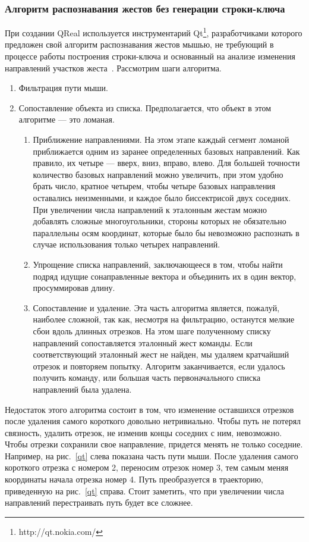 \documentclass[a5paper]{article}
\begin{document}
\subsubsection{Алгоритм распознавания жестов без генерации строки-ключа}
\label{qtAlgorithm}
При создании QReal используется инструментарий Qt\footnote{http://qt.nokia.com/}, разработчиками которого предложен свой алгоритм распознавания жестов мышью, не требующий в процессе работы построения строки-ключа и основанный на анализе изменения направлений участков жеста~\cite{qtGestures}. Рассмотрим шаги алгоритма.
\begin{enumerate}
  \item Фильтрация пути мыши.
  \item Сопоставление объекта из списка. Предполагается, что объект в этом алгоритме --- это ломаная.
  \begin{enumerate}
    \item Приближение направлениями. На этом этапе каждый сегмент ломаной приближается одним из заранее определенных базовых направлений. Как правило, их четыре --- вверх, вниз, вправо, влево. Для большей точности количество базовых направлений можно увеличить, при этом удобно брать число, кратное четырем, чтобы четыре базовых направления оставались неизменными, и каждое было биссектрисой двух соседних. При увеличении числа направлений к эталонным жестам можно добавлять сложные многоугольники, стороны которых не обязательно параллельны осям координат, которые было бы невозможно распознать в случае использования только четырех направлений.
    \item Упрощение списка направлений, заключающееся в том, чтобы найти подряд идущие сонаправленные вектора и объединить их в один вектор, просуммировав длину.
    \item Сопоставление и удаление. Эта часть алгоритма является, пожалуй, наиболее сложной, так как, несмотря на фильтрацию, останутся мелкие сбои вдоль длинных отрезков. На этом шаге полученному списку направлений сопоставляется эталонный жест команды. Если соответствующий эталонный жест не найден, мы удаляем кратчайший отрезок и повторяем попытку. Алгоритм заканчивается, если удалось получить команду, или большая часть первоначального списка направлений была удалена.
  \end{enumerate}
\end{enumerate}

Недостаток этого алгоритма состоит в том, что изменение оставшихся отрезков после удаления самого короткого довольно нетривиально. Чтобы путь не потерял связность, удалить отрезок, не изменив концы соседних с ним, невозможно. Чтобы отрезки сохранили свое направление, придется менять не только соседние. Например, на рис.~\ref{qt} слева показана часть пути мыши. После удаления самого короткого отрезка с номером 2, переносим отрезок номер 3, тем самым меняя координаты начала отрезка номер 4. Путь преобразуется в траекторию, приведенную на рис.~\ref{qt} справа. Стоит заметить, что при увеличении числа направлений перестраивать путь будет все сложнее. 
\end{document}
